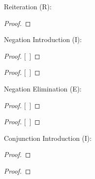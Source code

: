 Reiteration (R):
\begin{proof}
         
\end{proof}

Negation Introduction ({\enot}I):

\begin{multicols}{2}

\begin{proof}
\open
\close
{}[\ ]{\enot{}}
\end{proof}

\begin{proof}
\open
\close
{}[\ ]{\enot{}}
\end{proof}

\end{multicols}



Negation Elimination ({\enot}E):

\begin{multicols}{2}
\begin{proof}
\open
\close
{}[\ ]{}
\end{proof}


\begin{proof}
\open
\close
{}[\ ]{}

\end{proof}
\end{multicols}



Conjunction Introduction ({\eand}I):
 
\begin{multicols}{2}

\begin{proof}
         
\end{proof}

\begin{proof}
         
\end{proof}

\end{multicols}


